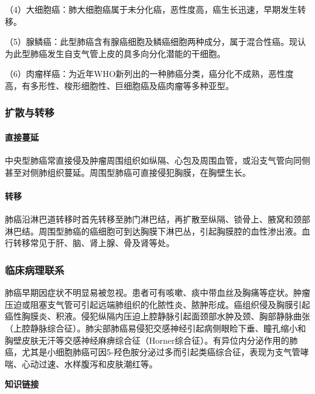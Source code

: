 （4）大细胞癌：肺大细胞癌属于未分化癌，恶性度高，癌生长迅速，早期发生转移。

（5）腺鳞癌：此型肺癌含有腺癌细胞及鳞癌细胞两种成分，属于混合性癌。现认为此型肺癌发生自支气管上皮的具多向分化潜能的干细胞。

（6）肉瘤样癌：为近年WHO新列出的一种肺癌分类，癌分化不成熟，恶性度高，有多形性、梭形细胞性、巨细胞癌及癌肉瘤等多种亚型。

\subsubsection{扩散与转移}

\paragraph{直接蔓延}
中央型肺癌常直接侵及肿瘤周围组织如纵隔、心包及周围血管，或沿支气管向同侧甚至对侧肺组织蔓延。周围型肺癌可直接侵犯胸膜，在胸壁生长。

\paragraph{转移}
肺癌沿淋巴道转移时首先转移至肺门淋巴结，再扩散至纵隔、锁骨上、腋窝和颈部淋巴结。周围型肺癌的癌细胞可到达胸膜下淋巴丛，引起胸膜腔的血性渗出液。血行转移常见于肝、脑、肾上腺、骨及肾等处。

\subsubsection{临床病理联系}

肺癌早期因症状不明显易被忽视。患者可有咳嗽、痰中带血丝及胸痛等症状。肿瘤压迫或阻塞支气管可引起远端肺组织的化脓性炎、脓肿形成。癌组织侵及胸膜引起癌性胸膜炎、积液。侵犯纵隔内压迫上腔静脉引起面颈部水肿及颈、胸部静脉曲张（上腔静脉综合征）。肺尖部肺癌易侵犯交感神经引起病侧眼睑下垂、瞳孔缩小和胸壁皮肤无汗等交感神经麻痹综合征（Horner综合征）。有异位内分泌作用的肺癌，尤其是小细胞肺癌可因5-羟色胺分泌过多而引起类癌综合征，表现为支气管哮喘、心动过速、水样腹泻和皮肤潮红等。

\begin{center}
    \textbf{知识链接}
\end{center}

